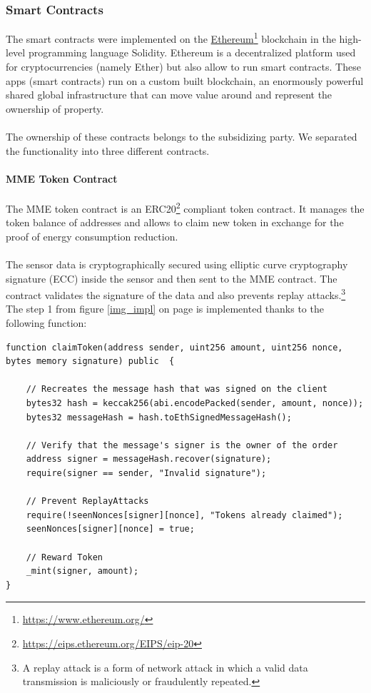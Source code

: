 \documentclass[11pt]{article}
\begin{document}
\subsubsection{Smart Contracts}
The smart contracts were implemented on the \hyperref[https://www.ethereum.org/]{Ethereum}\footnote{\href{https://www.ethereum.org/}{https://www.ethereum.org/}} blockchain in the high-level programming language Solidity. Ethereum is a decentralized platform used for cryptocurrencies (namely Ether) but also allow to run smart contracts. These apps (smart contracts) run on a custom built blockchain, an enormously powerful shared global infrastructure that can move value around and represent the ownership of property.\cite{23}\\\\
The ownership of these contracts belongs to the subsidizing party.
We separated the functionality into three different contracts.

\paragraph{MME Token Contract}
The MME token contract is an ERC20\footnote{\href{https://eips.ethereum.org/EIPS/eip-20}{https://eips.ethereum.org/EIPS/eip-20}} compliant token contract. It manages the token balance of addresses and allows to claim new token in exchange for the proof of energy consumption reduction. \\\\
The sensor data is cryptographically secured using elliptic curve cryptography signature (ECC) \cite{24} inside the sensor and then sent to the MME contract. The contract validates the signature of the data and also prevents replay attacks.\footnote{A replay attack is a form of network attack in which a valid data transmission is maliciously or fraudulently repeated.}\\
The step 1 from figure \ref{img_impl} on page \pageref{img_impl} is implemented thanks to the following function:
\begin{lstlisting}[language=Solidity, firstnumber=28,caption={src/smartcontracts/contracts/MMEToken.sol},captionpos=b]
function claimToken(address sender, uint256 amount, uint256 nonce, bytes memory signature) public  {

	// Recreates the message hash that was signed on the client
	bytes32 hash = keccak256(abi.encodePacked(sender, amount, nonce));
	bytes32 messageHash = hash.toEthSignedMessageHash();

	// Verify that the message's signer is the owner of the order
	address signer = messageHash.recover(signature);
	require(signer == sender, "Invalid signature");

	// Prevent ReplayAttacks
	require(!seenNonces[signer][nonce], "Tokens already claimed");
	seenNonces[signer][nonce] = true;

	// Reward Token
	_mint(signer, amount);
}
\end{lstlisting}
\end{document}
